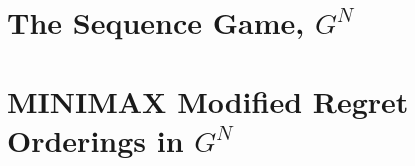 \documentclass[11pt]{article}
\theoremstyle{boldStyle}
\begin{document}
\section{The Sequence Game, $G^N$}





\newpage
\section{MINIMAX Modified Regret Orderings in $G^N$}





\newpage
\end{document}
